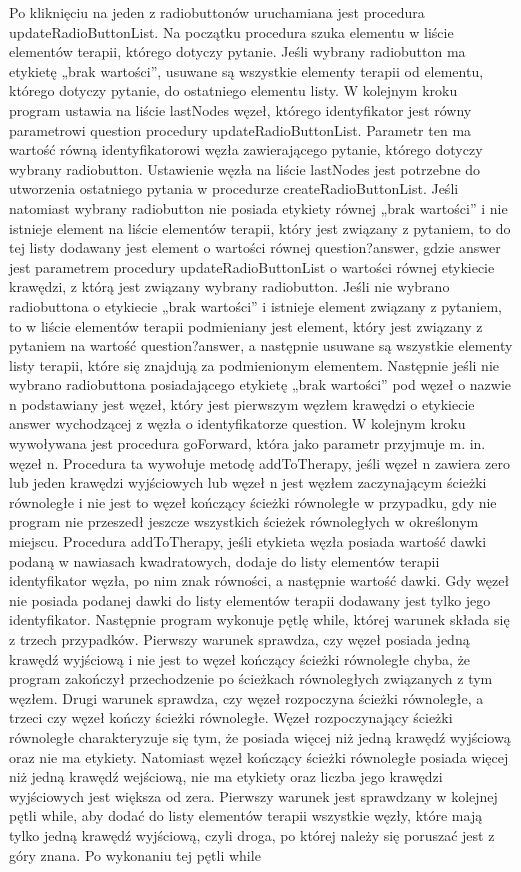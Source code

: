 \documentclass[oneside,a4paper]{book}
\begin{document}
\begin{spacing}{1.5}
Po kliknięciu na jeden z radiobuttonów uruchamiana jest procedura updateRadioButtonList. Na początku procedura szuka elementu w liście elementów terapii, którego dotyczy pytanie. Jeśli wybrany radiobutton ma etykietę „brak wartości”, usuwane są wszystkie elementy terapii od elementu, którego dotyczy pytanie, do ostatniego elementu listy. W kolejnym kroku program ustawia na liście lastNodes węzeł, którego identyfikator jest równy parametrowi question procedury updateRadioButtonList. Parametr ten ma wartość równą identyfikatorowi węzła zawierającego pytanie, którego dotyczy wybrany radiobutton. Ustawienie węzła na liście lastNodes jest potrzebne do utworzenia ostatniego pytania w procedurze createRadioButtonList. Jeśli natomiast wybrany radiobutton nie posiada etykiety równej „brak wartości” i nie istnieje element na liście elementów terapii, który jest związany z pytaniem, to do tej listy dodawany jest element o wartości równej question?answer, gdzie answer jest parametrem procedury updateRadioButtonList o wartości równej etykiecie krawędzi, z którą jest związany wybrany radiobutton. Jeśli nie wybrano radiobuttona o etykiecie „brak wartości” i istnieje element związany z pytaniem, to w liście elementów terapii podmieniany jest element, który jest związany z pytaniem na wartość question?answer, a następnie usuwane są wszystkie elementy listy terapii, które się znajdują za podmienionym elementem. Następnie jeśli nie wybrano radiobuttona posiadającego etykietę „brak wartości” pod węzeł o nazwie n podstawiany jest węzeł, który jest pierwszym węzłem krawędzi o etykiecie answer wychodzącej z węzła o identyfikatorze question. W kolejnym kroku wywoływana jest procedura goForward, która jako parametr przyjmuje m. in. węzeł n. Procedura ta wywołuje metodę addToTherapy, jeśli węzeł n zawiera zero lub jeden krawędzi wyjściowych lub węzeł n jest węzłem zaczynającym ścieżki równoległe i nie jest to węzeł kończący ścieżki równoległe w przypadku, gdy nie program nie przeszedł jeszcze wszystkich ścieżek równoległych w określonym miejscu. Procedura addToTherapy, jeśli etykieta węzła posiada wartość dawki podaną w nawiasach kwadratowych, dodaje do listy elementów terapii identyfikator węzła, po nim znak równości, a następnie wartość dawki. Gdy węzeł nie posiada podanej dawki do listy elementów terapii dodawany jest tylko jego identyfikator. Następnie program wykonuje pętlę while, której warunek składa się z trzech przypadków. Pierwszy warunek sprawdza, czy węzeł posiada jedną krawędź wyjściową i nie jest to węzeł kończący ścieżki równoległe chyba, że program zakończył przechodzenie po ścieżkach równoległych związanych z tym węzłem. Drugi warunek sprawdza, czy węzeł rozpoczyna ścieżki równoległe, a trzeci czy węzeł kończy ścieżki równoległe. Węzeł rozpoczynający ścieżki równoległe charakteryzuje się tym, że posiada więcej niż jedną krawędź wyjściową oraz nie ma etykiety. Natomiast węzeł kończący ścieżki równoległe posiada więcej niż jedną krawędź wejściową, nie ma etykiety oraz liczba jego krawędzi wyjściowych jest większa od zera. Pierwszy warunek jest sprawdzany w kolejnej pętli while, aby dodać do listy elementów terapii wszystkie węzły, które mają tylko jedną krawędź wyjściową, czyli droga, po której należy się poruszać jest z góry znana. Po wykonaniu tej pętli while 
\end{spacing}
\end{document}
